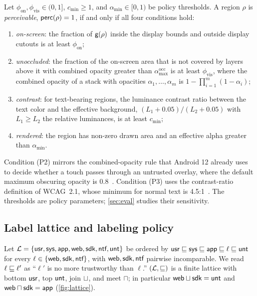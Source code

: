 \begin{definition}[Perceivability]\label{def:perc}
Let $\phi_{\mathrm{on}},\phi_{\mathrm{vis}}\in(0,1]$, $c_{\min}\ge 1$, and $\alpha_{\min}\in[0,1)$ be policy thresholds. A region $\rho$ is \emph{perceivable}, $\mathsf{perc}(\rho)=1$, if and only if all four conditions hold:
\begin{enumerate}[label=(P\arabic*)]
  \item \emph{on-screen}: the fraction of $\mathsf{g}(\rho)$ inside the display bounds and outside display cutouts is at least $\phi_{\mathrm{on}}$;
  \item \emph{unoccluded}: the fraction of the on-screen area that is not covered by layers above it with combined opacity greater than $\alpha_{\max}^{\mathrm{occ}}$ is at least $\phi_{\mathrm{vis}}$, where the combined opacity of a stack with opacities $\alpha_1,\dots,\alpha_m$ is $1-\prod_{i=1}^{m}(1-\alpha_i)$;
  \item \emph{contrast}: for text-bearing regions, the luminance contrast ratio between the text color and the effective background, $(L_1+0.05)/(L_2+0.05)$ with $L_1\ge L_2$ the relative luminances, is at least $c_{\min}$;
  \item \emph{rendered}: the region has non-zero drawn area and an effective alpha greater than $\alpha_{\min}$.
\end{enumerate}
\end{definition}

Condition (P2) mirrors the combined-opacity rule that Android 12 already uses to decide whether a touch passes through an untrusted overlay, where the default maximum obscuring opacity is 0.8~\cite{android12_untrusted_touch}. Condition (P3) uses the contrast-ratio definition of WCAG~2.1, whose minimum for normal text is 4.5:1~\cite{wcag21}. The thresholds are policy parameters; \cref{sec:eval} studies their sensitivity.

\subsection{Label lattice and labeling policy}

\begin{definition}\label{def:lattice}
Let $\mathcal{L}=\{\textsf{usr},\textsf{sys},\textsf{app},\textsf{web},\textsf{sdk},\textsf{ntf},\textsf{unt}\}$ be ordered by $\textsf{usr}\sqsubseteq\textsf{sys}\sqsubseteq\textsf{app}\sqsubseteq\ell\sqsubseteq\textsf{unt}$ for every $\ell\in\{\textsf{web},\textsf{sdk},\textsf{ntf}\}$, with $\textsf{web},\textsf{sdk},\textsf{ntf}$ pairwise incomparable. We read $\ell\sqsubseteq\ell'$ as ``$\ell'$ is no more trustworthy than $\ell$.'' $(\mathcal{L},\sqsubseteq)$ is a finite lattice with bottom $\textsf{usr}$, top $\textsf{unt}$, join $\sqcup$, and meet $\sqcap$; in particular $\textsf{web}\sqcup\textsf{sdk}=\textsf{unt}$ and $\textsf{web}\sqcap\textsf{sdk}=\textsf{app}$ (\cref{fig:lattice}).
\end{definition}

